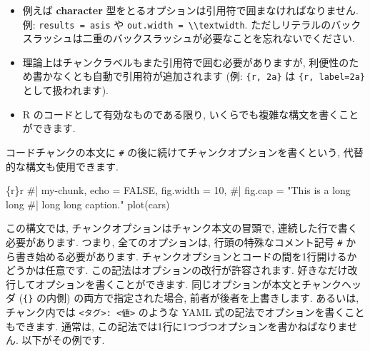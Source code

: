 \documentclass[
  lualatex,ja=standard,jafont=noto-otf]{bxjsreport}
\newenvironment{Shaded}{\begin{snugshade}}{\end{snugshade}}
\newcommand{\NormalTok}[1]{#1}
\providecommand{\tightlist}{%
  \setlength{\itemsep}{0pt}\setlength{\parskip}{0pt}}
\begin{document}
\begin{itemize}
\tightlist
\item
  例えば \textbf{character}
  型をとるオプションは引用符で囲まなければなりません. 例:
  \texttt{results\ =\ \textquotesingle{}asis\textquotesingle{}} や
  \texttt{out.width\ =\ \textquotesingle{}\textbackslash{}\textbackslash{}textwidth\textquotesingle{}}.
  ただしリテラルのバックスラッシュは二重のバックスラッシュが必要なことを忘れないでください.
\item
  理論上はチャンクラベルもまた引用符で囲む必要がありますが,
  利便性のため書かなくとも自動で引用符が追加されます (例:
  \texttt{\textasciigrave{}\textasciigrave{}\textasciigrave{}\{r,\ 2a\}\textasciigrave{}\textasciigrave{}\textasciigrave{}}
  は
  \texttt{\textasciigrave{}\textasciigrave{}\textasciigrave{}\{r,\ label=\textquotesingle{}2a\textquotesingle{}\}\textasciigrave{}\textasciigrave{}\textasciigrave{}}
  として扱われます).
\item
  R のコードとして有効なものである限り,
  いくらでも複雑な構文を書くことができます.
\end{itemize}

コードチャンクの本文に \texttt{\#\textbar{}}
の後に続けてチャンクオプションを書くという, 代替的な構文も使用できます.

\begin{Shaded}
\begin{Highlighting}[numbers=left,,]
\NormalTok{\textasciigrave{}\textasciigrave{}\textasciigrave{}\{r\}\textasciigrave{}r \textquotesingle{}\textquotesingle{}\textasciigrave{}}
\NormalTok{\#| my{-}chunk, echo = FALSE, fig.width = 10,}
\NormalTok{\#| fig.cap = "This is a long long}
\NormalTok{\#|   long long caption."}
\NormalTok{plot(cars)}
\NormalTok{\textasciigrave{}\textasciigrave{}\textasciigrave{}}
\end{Highlighting}
\end{Shaded}

この構文では, チャンクオプションはチャンク本文の冒頭で,
連続した行で書く必要があります. つまり, 全てのオプションは,
行頭の特殊なコメント記号 \texttt{\#\textbar{}}
から書き始める必要があります.
チャンクオプションとコードの間を1行開けるかどうかは任意です.
この記法はオプションの改行が許容されます.
好きなだけ改行してオプションを書くことができます.
同じオプションが本文とチャンクヘッダ
(\texttt{\textasciigrave{}\textasciigrave{}\textasciigrave{}\{\}}
の内側) の両方で指定された場合, 前者が後者を上書きします. あるいは,
チャンク内では
\texttt{\textless{}タグ\textgreater{}:\ \textless{}値\textgreater{}}
のような YAML 式の記法でオプションを書くこともできます. 通常は,
この記法では1行に1つづつオプションを書かねばなりません.
以下がその例です.
\end{document}
